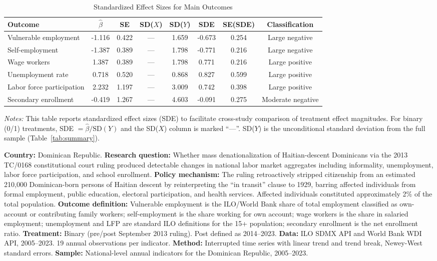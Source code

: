 \begin{table}[H]
\centering
\caption{Standardized Effect Sizes for Main Outcomes}
\label{tab:sde}
\begin{adjustbox}{max width=\textwidth}
\begin{tabular}{lccccccc}
\toprule
Outcome & $\hat{\beta}$ & SE & SD($X$) & SD($Y$) & SDE & SE(SDE) & Classification \\
\midrule
Vulnerable employment & -1.116 & 0.422 & --- & 1.659 & -0.673 & 0.254 & Large negative \\
Self-employment & -1.387 & 0.389 & --- & 1.798 & -0.771 & 0.216 & Large negative \\
Wage workers & 1.387 & 0.389 & --- & 1.798 & 0.771 & 0.216 & Large positive \\
Unemployment rate & 0.718 & 0.520 & --- & 0.868 & 0.827 & 0.599 & Large positive \\
Labor force participation & 2.232 & 1.197 & --- & 3.009 & 0.742 & 0.398 & Large positive \\
Secondary enrollment & -0.419 & 1.267 & --- & 4.603 & -0.091 & 0.275 & Moderate negative \\
\bottomrule
\end{tabular}
\end{adjustbox}
\par\vspace{0.3em}
{\footnotesize \emph{Notes:} This table reports standardized effect sizes (SDE) to facilitate cross-study comparison of treatment effect magnitudes. For binary (0/1) treatments, SDE $= \hat{\beta} / \text{SD}(Y)$ and the SD($X$) column is marked ``---''. SD($Y$) is the unconditional standard deviation from the full sample (Table~\ref{tab:summary}).

\textbf{Country:} Dominican Republic.
\textbf{Research question:} Whether mass denationalization of Haitian-descent Dominicans via the 2013 TC/0168 constitutional court ruling produced detectable changes in national labor market aggregates including informality, unemployment, labor force participation, and school enrollment.
\textbf{Policy mechanism:} The ruling retroactively stripped citizenship from an estimated 210,000 Dominican-born persons of Haitian descent by reinterpreting the ``in transit'' clause to 1929, barring affected individuals from formal employment, public education, electoral participation, and health services. Affected individuals constituted approximately 2\% of the total population.
\textbf{Outcome definition:} Vulnerable employment is the ILO/World Bank share of total employment classified as own-account or contributing family workers; self-employment is the share working for own account; wage workers is the share in salaried employment; unemployment and LFP are standard ILO definitions for the 15+ population; secondary enrollment is the net enrollment ratio.
\textbf{Treatment:} Binary (pre/post September 2013 ruling). Post defined as 2014--2023.
\textbf{Data:} ILO SDMX API and World Bank WDI API, 2005--2023. 19 annual observations per indicator.
\textbf{Method:} Interrupted time series with linear trend and trend break, Newey-West standard errors.
\textbf{Sample:} National-level annual indicators for the Dominican Republic, 2005--2023.

}
\end{table}

